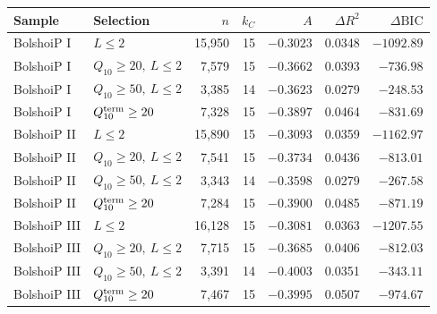 \begin{tabular}{llrrrrr}
\toprule
Sample & Selection & $n$ & $k_C$ & $A$ & $\Delta R^2$ & $\Delta\mathrm{BIC}$ \\
\midrule
BolshoiP I & $L\leq2$ & 15,950 & 15 & $-0.3023$ & 0.0348 & $-1092.89$ \\
BolshoiP I & $Q_{10}\geq20,\ L\leq2$ & 7,579 & 15 & $-0.3662$ & 0.0393 & $-736.98$ \\
BolshoiP I & $Q_{10}\geq50,\ L\leq2$ & 3,385 & 14 & $-0.3623$ & 0.0279 & $-248.53$ \\
BolshoiP I & $Q_{10}^{\rm term}\geq20$ & 7,328 & 15 & $-0.3897$ & 0.0464 & $-831.69$ \\
BolshoiP II & $L\leq2$ & 15,890 & 15 & $-0.3093$ & 0.0359 & $-1162.97$ \\
BolshoiP II & $Q_{10}\geq20,\ L\leq2$ & 7,541 & 15 & $-0.3734$ & 0.0436 & $-813.01$ \\
BolshoiP II & $Q_{10}\geq50,\ L\leq2$ & 3,343 & 14 & $-0.3598$ & 0.0279 & $-267.58$ \\
BolshoiP II & $Q_{10}^{\rm term}\geq20$ & 7,284 & 15 & $-0.3900$ & 0.0485 & $-871.19$ \\
BolshoiP III & $L\leq2$ & 16,128 & 15 & $-0.3081$ & 0.0363 & $-1207.55$ \\
BolshoiP III & $Q_{10}\geq20,\ L\leq2$ & 7,715 & 15 & $-0.3685$ & 0.0406 & $-812.03$ \\
BolshoiP III & $Q_{10}\geq50,\ L\leq2$ & 3,391 & 14 & $-0.4003$ & 0.0351 & $-343.11$ \\
BolshoiP III & $Q_{10}^{\rm term}\geq20$ & 7,467 & 15 & $-0.3995$ & 0.0507 & $-974.67$ \\
\bottomrule
\end{tabular}
